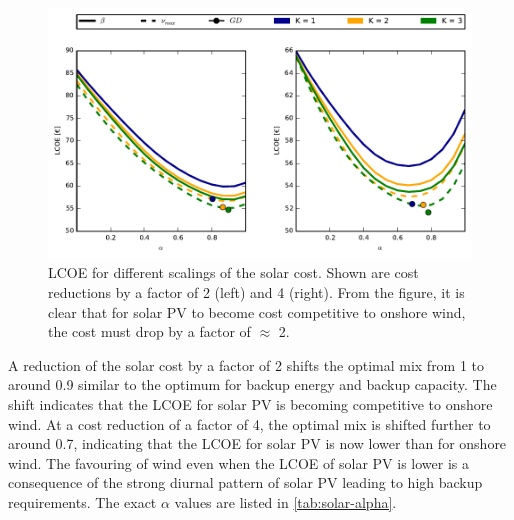 \documentclass[a4paper, 5p, sort&compress]{elsarticle}%
\begin{document}
\begin{figure}[p]
  \centering
  \includegraphics[width = 2\columnwidth]{solarAnalysis}
  \caption{LCOE for different scalings of the solar cost. Shown are
    cost reductions by a factor of 2 (left) and 4 (right). From the
    figure, it is clear that for solar PV to become cost competitive
    to onshore wind, the cost must drop by a factor of $\approx$ 2.}
  \label{fig:red-solar}
\end{figure}

A reduction of the solar cost by a factor of 2 shifts the optimal mix
from 1 to around 0.9 similar to the optimum for backup energy and
backup capacity. The shift indicates that the LCOE for solar PV is
becoming competitive to onshore wind. At a cost reduction of a factor
of 4, the optimal mix is shifted further to around 0.7, indicating
that the LCOE for solar PV is now lower than for onshore wind. The
favouring of wind even when the LCOE of solar PV is lower is a
consequence of the strong diurnal pattern of solar PV leading to high
backup requirements. The exact $\alpha$ values are listed in
\cref{tab:solar-alpha}.
\end{document}
